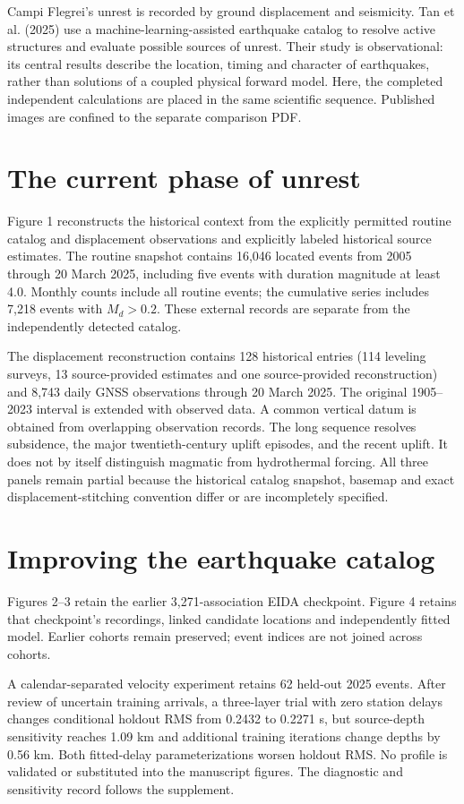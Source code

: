 Campi Flegrei's unrest is recorded by ground displacement and seismicity. Tan et al. (2025) use a machine-learning-assisted earthquake catalog to resolve active structures and evaluate possible sources of unrest. Their study is observational: its central results describe the location, timing and character of earthquakes, rather than solutions of a coupled physical forward model. Here, the completed independent calculations are placed in the same scientific sequence. Published images are confined to the separate comparison PDF.

\section*{The current phase of unrest}
Figure 1 reconstructs the historical context from the explicitly permitted routine catalog and displacement observations and explicitly labeled historical source estimates. The routine snapshot contains 16,046 located events from 2005 through 20 March 2025, including five events with duration magnitude at least 4.0. Monthly counts include all routine events; the cumulative series includes 7,218 events with $M_d>0.2$. These external records are separate from the independently detected catalog.

The displacement reconstruction contains 128 historical entries (114 leveling surveys, 13 source-provided estimates and one source-provided reconstruction) and 8,743 daily GNSS observations through 20 March 2025. The original 1905--2023 interval is extended with observed data. A common vertical datum is obtained from overlapping observation records. The long sequence resolves subsidence, the major twentieth-century uplift episodes, and the recent uplift. It does not by itself distinguish magmatic from hydrothermal forcing. All three panels remain partial because the historical catalog snapshot, basemap and exact displacement-stitching convention differ or are incompletely specified.


\section*{Improving the earthquake catalog}
Figures 2--3 retain the earlier 3,271-association EIDA checkpoint. Figure 4 retains that checkpoint's recordings, linked candidate locations and independently fitted model. Earlier cohorts remain preserved; event indices are not joined across cohorts.


A calendar-separated velocity experiment retains 62 held-out 2025 events. After review of uncertain training arrivals, a three-layer trial with zero station delays changes conditional holdout RMS from 0.2432 to 0.2271 s, but source-depth sensitivity reaches 1.09 km and additional training iterations change depths by 0.56 km. Both fitted-delay parameterizations worsen holdout RMS. No profile is validated or substituted into the manuscript figures. The diagnostic and sensitivity record follows the supplement.

